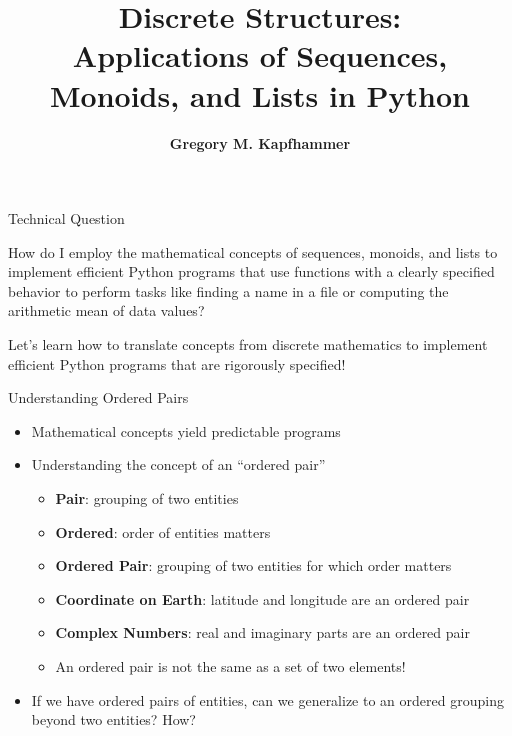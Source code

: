 \documentclass[14pt,aspectratio=169]{beamer}
\title{Discrete Structures: \\ Applications of Sequences, Monoids, and
Lists in Python}
\author{{\bf Gregory M. Kapfhammer}}
\institute[shortinst]{{\bf Department of Computer Science, Allegheny College}}
\begin{document}
{
  \begin{frame}
    \titlepage
  \end{frame}
}

%
\begin{frame}{Technical Question}
  \hspace*{.25in}
  \begin{minipage}{4.8in}
    \vspace*{.1in}
    \begin{center}
      {\large How do I employ the mathematical concepts of sequences,
        monoids, and lists to implement efficient Python programs that use
        functions with a clearly specified behavior to perform tasks like
        finding a name in a file or computing the arithmetic mean of data values?}
    \end{center}
  \end{minipage}
  \vspace{2ex}
  \begin{center}
    \small Let's learn how to translate concepts from discrete mathematics to
    implement efficient Python programs that are rigorously specified!
  \end{center}
\end{frame}

%
\begin{frame}{Understanding Ordered Pairs}
  \begin{itemize}
    \item Mathematical concepts yield predictable programs
      \vspace*{-.15in}
    \item Understanding the concept of an ``ordered pair''
      \begin{itemize}
        \item {\bf Pair}: grouping of two entities
        \item {\bf Ordered}: order of entities matters
        \item {\bf Ordered Pair}: grouping of two entities for which order
          matters
        \item {\bf Coordinate on Earth}: latitude and longitude are an ordered
          pair
        \item {\bf Complex Numbers}: real and imaginary parts are an ordered
          pair
        \item An ordered pair is not the same as a set of two elements!
      \end{itemize}
      \vspace*{-.2in}
    \item If we have ordered pairs of entities, can we generalize to
      an ordered grouping beyond two entities? How?
  \end{itemize}
\end{frame}
\end{document}

